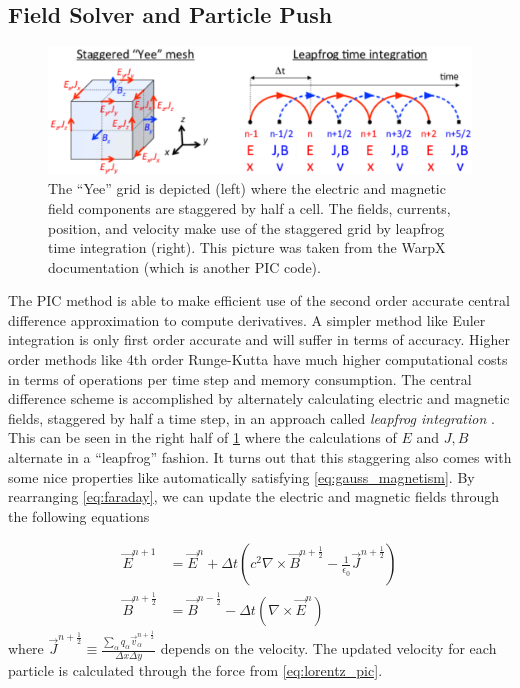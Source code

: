 \subsection{Field Solver and Particle Push}

\begin{figure}
	\centering 
	\includegraphics[width=0.8\linewidth]{planning/images/yee_grid.PNG}
	\caption{The ``Yee'' grid is depicted (left) where the electric and magnetic field components are staggered by half a cell. The fields, currents, position, and velocity make use of the staggered grid by leapfrog time integration (right). This picture was taken from the WarpX documentation \cite{WarpX_documentation} (which is another PIC code).}
	\label{fig:yee_grid}
\end{figure}

The \gls{PIC} method is able to make efficient use of the second order accurate central difference approximation to compute derivatives. A simpler method like Euler integration is only first order accurate and will suffer in terms of accuracy. Higher order methods like 4th order Runge-Kutta have much higher computational costs in terms of operations per time step and memory consumption. The central difference scheme is accomplished by alternately calculating electric and magnetic fields, staggered by half a time step, in an approach called \emph{leapfrog integration} \cite{Birdsall_2004_PIC}. This can be seen in the right half of \cref{fig:yee_grid} where the calculations of $E$ and $J,B$ alternate in a ``leapfrog'' fashion. It turns out that this staggering also comes with some nice properties like automatically satisfying \cref{eq:gauss_magnetism}. By rearranging \cref{eq:faraday}, we can update the electric and magnetic fields through the following equations \cite{Arber_2015_PPCF}

\begin{align}
	\vec{E}^{n+1} &= \vec{E}^{n} + \Delta t (c^2 \nabla \times \vec{B}^{n+\frac{1}{2}} - \frac{1}{\epsilon_0} \vec{J}^{n+\frac{1}{2}}) \label{eq:E_update} \\
	\vec{B}^{n+\frac{1}{2}} &= \vec{B}^{n-\frac{1}{2}} - \Delta t (\nabla \times \vec{E}^{n}) \label{eq:B_update}
\end{align}
where $\vec{J}^{n+\frac{1}{2}} \equiv \frac{\sum_\alpha q_\alpha \vec{v}^{n+\frac{1}{2}}_\alpha}{\Delta x \Delta y}$ depends on the velocity. The updated velocity for each particle is calculated through the force from \cref{eq:lorentz_pic}. 

